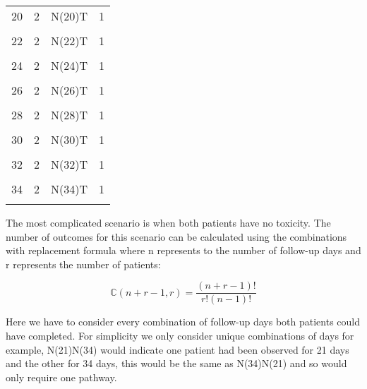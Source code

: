 \begin{table}[H]
{\begin{tabular}[t]{cccc}
			20 & 2 & N(20)T & 1\\
			\cellcolor{gray!6}{21} & \cellcolor{gray!6}{2} & \cellcolor{gray!6}{N(21)T} & \cellcolor{gray!6}{1}\\
			22 & 2 & N(22)T & 1\\
			\cellcolor{gray!6}{23} & \cellcolor{gray!6}{2} & \cellcolor{gray!6}{N(23)T} & \cellcolor{gray!6}{1}\\
			24 & 2 & N(24)T & 1\\
			\cellcolor{gray!6}{25} & \cellcolor{gray!6}{2} & \cellcolor{gray!6}{N(25)T} & \cellcolor{gray!6}{1}\\
			26 & 2 & N(26)T & 1\\
			\cellcolor{gray!6}{27} & \cellcolor{gray!6}{2} & \cellcolor{gray!6}{N(27)T} & \cellcolor{gray!6}{1}\\
			28 & 2 & N(28)T & 1\\
			\cellcolor{gray!6}{29} & \cellcolor{gray!6}{2} & \cellcolor{gray!6}{N(29)T} & \cellcolor{gray!6}{1}\\
			30 & 2 & N(30)T & 1\\
			\cellcolor{gray!6}{31} & \cellcolor{gray!6}{2} & \cellcolor{gray!6}{N(31)T} & \cellcolor{gray!6}{1}\\
			32 & 2 & N(32)T & 1\\
			\cellcolor{gray!6}{33} & \cellcolor{gray!6}{2} & \cellcolor{gray!6}{N(33)T} & \cellcolor{gray!6}{1}\\
			34 & 2 & N(34)T & 1\\
			\cellcolor{gray!6}{35} & \cellcolor{gray!6}{2} & \cellcolor{gray!6}{NT} & \cellcolor{gray!6}{1}\\
			\bottomrule
	\end{tabular}}
\end{table}

The most complicated scenario is when both patients have no toxicity. The number of outcomes for this scenario can be calculated using the combinations with replacement formula where n represents to the number of follow-up days and r represents the number of patients: 

\begin{equation}
	\label{eq_tite-dtp:combinations}
	\mathbb{C}(n+r-1,r) = \frac{(n+r-1)!}{r!(n-1)!}
\end{equation}

Here we have to consider every combination of follow-up days both patients could have completed. For simplicity we only consider unique combinations of days for example, N(21)N(34) would indicate one patient had been observed for 21 days and the other for 34 days, this would be the same as N(34)N(21) and so would only require one pathway. 

